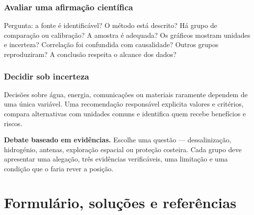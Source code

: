 \documentclass[11pt,a4paper,oneside]{book}
\begin{document}
\section{Avaliar uma afirmação científica}
Pergunta: a fonte é identificável? O método está descrito? Há grupo de comparação ou calibração? A amostra é adequada? Os gráficos mostram unidades e incerteza? Correlação foi confundida com causalidade? Outros grupos reproduziram? A conclusão respeita o alcance dos dados?

\section{Decidir sob incerteza}
Decisões sobre água, energia, comunicações ou materiais raramente dependem de uma única variável. Uma recomendação responsável explicita valores e critérios, compara alternativas com unidades comuns e identifica quem recebe benefícios e riscos.

\begin{stem}
\textbf{Debate baseado em evidências.} Escolhe uma questão — dessalinização, hidrogénio, antenas, exploração espacial ou proteção costeira. Cada grupo deve apresentar uma alegação, três evidências verificáveis, uma limitação e uma condição que o faria rever a posição.
\end{stem}

\part{Formulário, soluções e referências}
\end{document}
